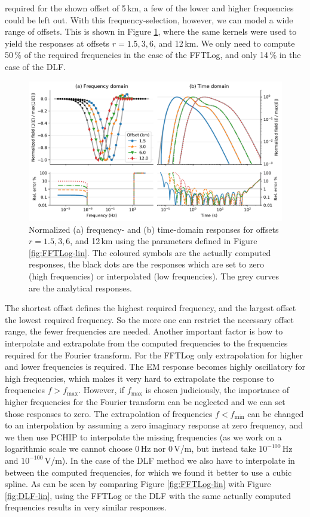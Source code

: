 \documentclass[extra, camera,%
]{gji}
\newlength{\fwidth}
\begin{document}
required for the shown offset of 5\,km, a few of the lower and higher
frequencies could be left out. With this frequency-selection, however, we can
model a wide range of offsets. This is shown in Figure \ref{fig:multi-offset},
where the same kernels were used to yield the responses at offsets $r=1.5,3,6$,
and 12\,km. We only need to compute 50\,\% of the required frequencies in the
case of the FFTLog, and only 14\,\% in the case of the DLF.
%
\begin{figure}
  \centering
  \includegraphics[width=0.75\fwidth]{03-multi-offset}
  \caption{Normalized (a) frequency- and (b) time-domain responses for offsets
    $r=1.5,3,6$, and 12\,km using the parameters defined in Figure
    \ref{fig:FFTLog-lin}. The coloured symbols are the actually computed
    responses, the black dots are the responses which are set to zero (high
    frequencies) or interpolated (low frequencies). The grey curves are the
    analytical responses.}
  \label{fig:multi-offset}
\end{figure}
%

The shortest offset defines the highest required frequency, and the largest
offset the lowest required frequency. So the more one can restrict the
necessary offset range, the fewer frequencies are needed. Another important
factor is how to interpolate and extrapolate from the computed frequencies to
the frequencies required for the Fourier transform. For the FFTLog only
extrapolation for higher and lower frequencies is required. The EM response
becomes highly oscillatory for high frequencies, which makes it very hard to
extrapolate the response to frequencies $f>f_\mathrm{max}$. However, if
$f_\mathrm{max}$ is chosen judiciously, the importance of higher frequencies
for the Fourier transform can be neglected and we can set those responses to
zero. The extrapolation of frequencies $f<f_\mathrm{min}$ can be changed to an
interpolation by assuming a zero imaginary response at zero frequency, and we
then use PCHIP to interpolate the missing frequencies (as we work on a
logarithmic scale we cannot choose 0\,Hz nor 0\,V/m, but instead take
$10^{-100}$\,Hz and $10^{-100}$\,V/m). In the case of the DLF method we also
have to interpolate in between the computed frequencies, for which we found it
better to use a cubic spline. As can be seen by comparing Figure
\ref{fig:FFTLog-lin} with Figure \ref{fig:DLF-lin}, using the FFTLog or the DLF
with the same actually computed frequencies results in very similar responses.
\end{document}
